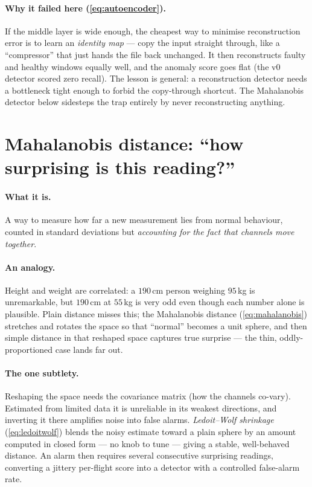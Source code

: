 \paragraph{Why it failed here (\cref{eq:autoencoder}).} If the middle layer is wide enough,
the cheapest way to minimise reconstruction error is to learn an \emph{identity map} --- copy
the input straight through, like a ``compressor'' that just hands the file back unchanged. It
then reconstructs faulty and healthy windows equally well, and the anomaly score goes flat
(the v0 detector scored zero recall). The lesson is general: a reconstruction detector needs a
bottleneck tight enough to forbid the copy-through shortcut. The Mahalanobis detector below
sidesteps the trap entirely by never reconstructing anything.

\section{Mahalanobis distance: ``how surprising is this reading?''}
\label{sec:ml-maha}

\paragraph{What it is.} A way to measure how far a new measurement lies from normal behaviour,
counted in standard deviations but \emph{accounting for the fact that channels move together}.

\paragraph{An analogy.} Height and weight are correlated: a $190$\,cm person weighing $95$\,kg
is unremarkable, but $190$\,cm at $55$\,kg is very odd even though each number alone is
plausible. Plain distance misses this; the Mahalanobis distance (\cref{eq:mahalanobis})
stretches and rotates the space so that ``normal'' becomes a unit sphere, and then simple
distance in that reshaped space captures true surprise --- the thin, oddly-proportioned case
lands far out.

\paragraph{The one subtlety.} Reshaping the space needs the covariance matrix (how the
channels co-vary). Estimated from limited data it is unreliable in its weakest directions, and
inverting it there amplifies noise into false alarms. \emph{Ledoit--Wolf shrinkage}
(\cref{eq:ledoitwolf}) blends the noisy estimate toward a plain sphere by an amount computed
in closed form --- no knob to tune --- giving a stable, well-behaved distance. An alarm then
requires several consecutive surprising readings, converting a jittery per-flight score into a
detector with a controlled false-alarm rate.

